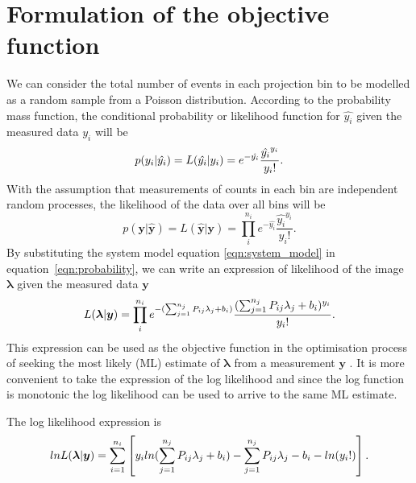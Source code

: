 \section{Formulation of the objective function}
We can consider the total number of events in each projection bin to be modelled as a random sample from a Poisson distribution. According to the probability mass function, the conditional probability or likelihood function for $\hat{y_i}$ given the measured data ${y_i}$ will be
\begin{equation}
p({y_i}|{\hat{y_i}}) = L({\hat{y_i}}|{y_i}) = e^{-\hat{y_i}} \frac{\hat{y_i}^{y_i}}{{y_i}!}  \\  .
\end{equation}
With the assumption that measurements of counts in each bin are independent random processes, the likelihood of the data over all bins will be
\begin{equation}
p(\bm{y}|\bm{\hat{y}}) = L(\bm{\hat{y}}|\bm{y}) = \prod_i^{n_i} e^{-\hat{y_i}} \frac{\hat{y_i}^{y_i}}{{y_i}!} . 
\label{eqn:probability}
\end{equation}
By substituting the system model equation \ref{eqn:system_model} in equation~\ref{eqn:probability}, we can write an expression of likelihood of the image $\bm{\lambda}$ given the measured data $\bm{y}$
\begin{equation}
    L(\bm{\lambda}|\bm{y})  = \prod_i^{n_i} e^{-(\sum_{j=1}^{n_j} P_{ij} \lambda_j + b_{i} )} \frac{(\sum_{j=1}^{n_j} P_{ij} \lambda_j + b_{i} )^{y_i}}{{y_i}!} \\ . \\
\end{equation}
This expression can be used as the objective function in the optimisation process of seeking the most likely (ML) estimate of $\bm{\lambda}$ from a measurement $\bm{y}$ . 
It is more convenient to take the expression of the log likelihood and since the log function is monotonic the log likelihood can be used to arrive to the same ML estimate.

The log likelihood expression is
\begin{equation}
    lnL(\bm{\lambda}|\bm{y})  = \sum_{i=1}^{n_i}\left[ y_i ln(\sum_{j=1}^{n_j} P_{ij} \lambda_j + b_i) -\sum_{j=1}^{n_j} P_{ij} \lambda_j - b_i - ln({y_i}!) \right] \\.
\label{eqn:log_likelihood}
\end{equation}
